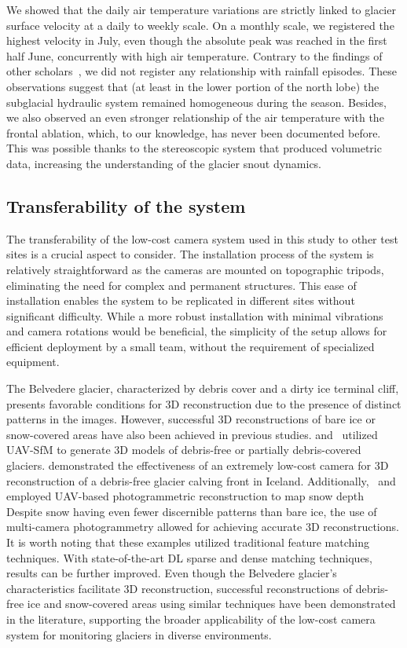 We showed that the daily air temperature variations are strictly linked to glacier
surface velocity at a daily to weekly scale.
On a monthly scale, we registered the highest velocity in July, even though the absolute
peak was reached in the first half June, concurrently with high air temperature.
Contrary to the findings of other
scholars~\citep{benoit2015multi,horgan2015glacier,sugiyama2010surface}, we did not
register any relationship with rainfall episodes.
These observations suggest that (at least in the lower portion of the north lobe) the
subglacial hydraulic system remained homogeneous during the season.
Besides, we also observed an even stronger relationship of the air temperature with the
frontal ablation, which, to our knowledge, has never been documented before.
This was possible thanks to the stereoscopic system that produced volumetric data,
increasing the understanding of the glacier snout dynamics.

\subsection{Transferability of the system}\label{sec:4:transferability}

The transferability of the low-cost camera system used in this study to other test sites
is a crucial aspect to consider.
The installation process of the system is relatively straightforward as the cameras are
mounted on topographic tripods, eliminating the need for complex and permanent
structures.
This ease of installation enables the system to be replicated in different sites without
significant difficulty.
While a more robust installation with minimal vibrations and camera rotations would be
beneficial, the simplicity of the setup allows for efficient deployment by a small team,
without the requirement of specialized equipment.

The Belvedere glacier, characterized by debris cover and a dirty ice terminal cliff,
presents favorable conditions for 3D reconstruction due to the presence of distinct
patterns in the images.
However, successful 3D reconstructions of bare ice or snow-covered areas have also been
achieved in previous studies.
\citet{belloni2023} and~\citet{Gindraux2017} utilized UAV-SfM to generate 3D models
of debris-free or partially debris-covered glaciers.
\citet{Taylor2023} demonstrated the effectiveness of an extremely low-cost camera for 3D
reconstruction of a debris-free glacier calving front in Iceland.
Additionally,~\citet{Avanzi2018} and~\citet{DeMichele2016} employed UAV-based
photogrammetric reconstruction to map snow depth Despite snow having even fewer
discernible patterns than bare ice, the use of multi-camera photogrammetry allowed for
achieving accurate 3D reconstructions.
It is worth noting that these examples utilized traditional feature matching techniques.
With state-of-the-art DL sparse and dense matching techniques, results can be further
improved.
Even though the Belvedere glacier's characteristics facilitate 3D reconstruction,
successful reconstructions of debris-free ice and snow-covered areas using similar
techniques have been demonstrated in the literature, supporting the broader applicability
of the low-cost camera system for monitoring glaciers in diverse environments.

\makechapterbibliography{}
